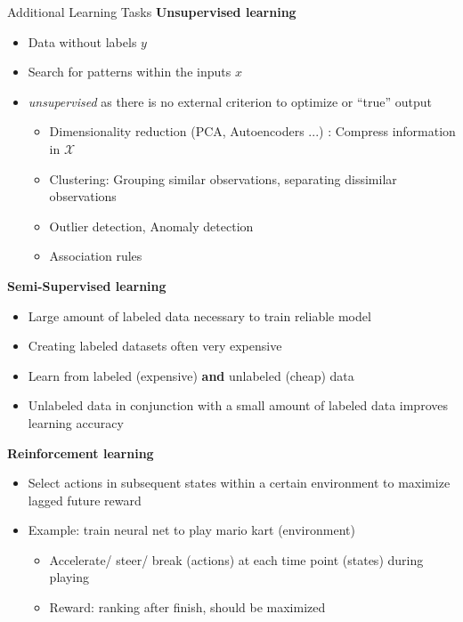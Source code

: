 \documentclass[11pt,compress,t,notes=noshow, xcolor=table]{beamer}
\begin{document}
\begin{vbframe}{Additional Learning Tasks}
\lz
  \textbf{Unsupervised learning}
    \begin{itemize}
      \item Data without labels $y$
      \item Search for patterns within the inputs $x$
      \item \textit{unsupervised} as there is no external criterion to optimize or \enquote{true} output
      \begin{itemize}
        \item Dimensionality reduction (PCA, Autoencoders ...) : Compress information in $\mathcal X$
        \item Clustering: Grouping similar observations, separating dissimilar observations
        \item Outlier detection, Anomaly detection
        \item Association rules
      \end{itemize}
    \end{itemize}
\framebreak
\lz
  \textbf{Semi-Supervised learning}
  \begin{itemize}
    \item Large amount of labeled data necessary to train reliable model
    \item Creating labeled datasets often very expensive
    \item Learn from labeled (expensive) \textbf{and} unlabeled (cheap) data
    \item Unlabeled data in conjunction with a small amount of labeled data improves learning accuracy
  \end{itemize}
  \vspace{0.5cm}
  \textbf{Reinforcement learning}
  \begin{itemize}
    \item Select actions in subsequent  states within a certain environment to maximize lagged future reward
    \item Example: train neural net to play mario kart (environment)
    \begin{itemize}
      \item Accelerate/ steer/ break (actions) at each time point (states) during playing
      \item Reward: ranking after finish, should be maximized
    \end{itemize}
  \end{itemize}
\end{vbframe}





\endlecture
\end{document}
